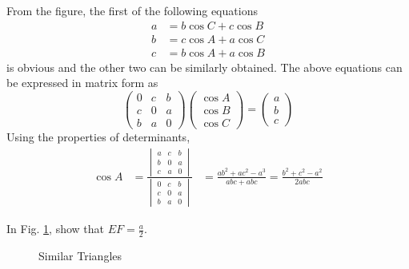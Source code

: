 \proof From the figure, the first of the following equations
%
\begin{align}
a &= b \cos C + c \cos B \\
b &= c \cos A + a \cos C \\
c &= b \cos A + a \cos B
\end{align}
%
is obvious and the other two can be similarly obtained.  The above equations can be expressed in matrix form as
%
\begin{equation}
\begin{pmatrix}
0 & c & b \\
c & 0 & a \\
b & a & 0
\end{pmatrix}
\begin{pmatrix}
\cos A \\
\cos B \\
\cos C
\end{pmatrix}
= 
\begin{pmatrix}
a\\
b\\
c
\end{pmatrix}
\end{equation}
%
Using the properties of determinants,
%
\begin{align}
\cos A &= \frac{
\begin{vmatrix}
a & c & b \\
b & 0 & a \\
c & a & 0
\end{vmatrix}
	}
	{
\begin{vmatrix}
0 & c & b \\
c & 0 & a \\
b & a & 0
\end{vmatrix}
	}
	&=\frac{ab^2 + ac^2 - a^3}{abc + abc} = \frac{b^2 + c^2 - a^2}{2abc}
\end{align}
%
%
\begin{problem}
	In Fig. \ref{ch2_sim_triang}, show that $EF = \frac{a}{2}$.  
\end{problem}
%
\begin{figure}[!ht]
	\begin{center}
		
		\resizebox{\columnwidth}{!}{}
	\end{center}
	\caption{Similar Triangles}
	\label{ch2_sim_triang}	
\end{figure}


